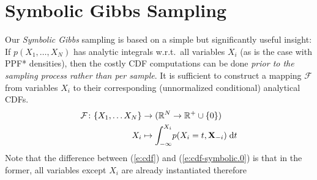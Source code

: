 \documentclass{article} %
\newcommand{\bvec}[1]{\textbf{#1}}
\newcommand{\pr}{p}
\newcommand{\dd}{\;\mathrm{d}} %
\begin{document}
\section{Symbolic Gibbs Sampling}
\label{sect:symbolic.gibbs}

%
Our \emph{Symbolic Gibbs} sampling is based on a simple but significantly useful insight:
If $\pr(X_1, \ldots, X_N)$
has analytic integrals w.r.t.\ all variables $X_i$ (as is the case with PPF* densities),
then the costly CDF computations can be done \emph{prior to the sampling process rather than per sample}. 
It is sufficient to construct a mapping $\mathcal{F}$ from variables $X_i$ to their corresponding (unnormalized conditional) analytical CDFs. 
\begin{align} \footnotesize
 \mathcal{F}\colon \{X_1, \ldots X_N\} &\to (\mathbb{R}^N \to \mathbb{R}^{+} \cup \{0\}) \notag\\
 X_i &\mapsto \int_{-\infty}^{X_i} \! \pr(X_i = t , \bvec{X}_{-i}) \dd  t 
\label{e:cdf-symbolic.0}	
\end{align}
Note that the difference between (\ref{e:cdf}) and (\ref{e:cdf-symbolic.0}) is that in the former, 
all variables except $X_i$ are already instantiated therefore 
\end{document}
